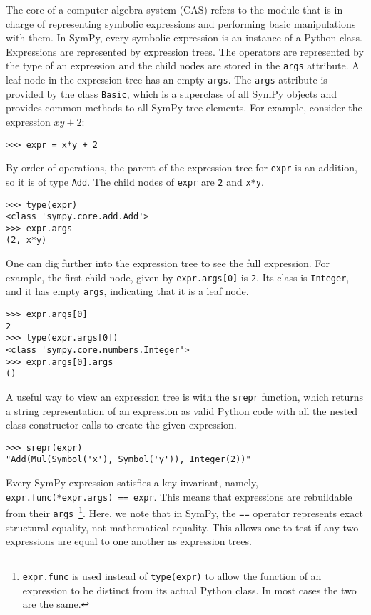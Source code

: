 The core of a computer algebra system (CAS) refers to the module that is in
charge of representing symbolic expressions and performing basic manipulations
with them. In SymPy, every symbolic expression is an instance of a Python class.
Expressions are represented by expression trees. The operators are represented
by the type of an expression and the child nodes are stored in the
\texttt{args} attribute. A leaf node in the expression tree has an empty
\texttt{args}.
The \texttt{args} attribute is provided by the class \texttt{Basic},
which is a superclass of all SymPy objects and
provides common methods to all SymPy tree-elements.
For example, consider the expression $xy + 2$:
\begin{verbatim}
>>> expr = x*y + 2
\end{verbatim}
By order of operations, the parent of the expression tree for \texttt{expr} is
an addition, so it is of type \texttt{Add}. The child nodes of \texttt{expr} are
\texttt{2} and \texttt{x*y}.
\begin{verbatim}
>>> type(expr)
<class 'sympy.core.add.Add'>
>>> expr.args
(2, x*y)
\end{verbatim}

One can dig further into the expression tree to see the full expression. For
example, the first child node, given by \texttt{expr.args[0]} is
\texttt{2}. Its class is \texttt{Integer}, and it has empty \texttt{args},
indicating that it is a leaf node.
\begin{verbatim}
>>> expr.args[0]
2
>>> type(expr.args[0])
<class 'sympy.core.numbers.Integer'>
>>> expr.args[0].args
()
\end{verbatim}

A useful way to view an expression tree is with the \texttt{srepr} function,
which returns a string representation of an expression as valid Python code
with all the nested class constructor calls to create the given expression.
\begin{verbatim}
>>> srepr(expr)
"Add(Mul(Symbol('x'), Symbol('y')), Integer(2))"
\end{verbatim}

Every SymPy expression satisfies a key invariant, namely,
\verb|expr.func(*expr.args) == expr|. This means that expressions are
rebuildable from their \texttt{args}~\footnote{\texttt{expr.func} is used
instead of \texttt{type(expr)} to allow the function of an expression to be
distinct from its actual Python class. In most cases the two are the same.}.
Here, we note that in SymPy, the \texttt{==} operator represents exact
structural equality, not mathematical equality. This allows one to test if
any two expressions are equal to one another as expression trees.

